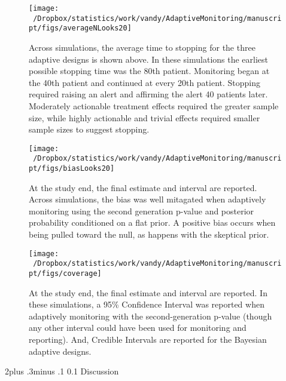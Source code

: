 \documentclass[12pt,oneside]{book}
\makeatletter
\newlength{\li}\setlength{\li}{14.48pt}
\newlength{\di}\setlength{\di}{-3.5mm}
\renewcommand\section{ \@startsection {section}{1}{\z@}%
    {2\@bls  plus .3\@bls minus .1\@bls}%
    {0.1\@bls}%
    {\centering\normalfont}}
\theoremstyle{definition}
\theoremstyle{definition}
\theoremstyle{definition}
\theoremstyle{remark}
\makeatother
\begin{document}
\begin{figure}[H]

{\centering \texttt{[image: ~/Dropbox/statistics/work/vandy/AdaptiveMonitoring/manuscript/figs/averageNLooks20]} 

}

\caption{Across  simulations, the average time to stopping for the three adaptive designs is shown above.  In these simulations the earliest possible stopping time was the 80th patient.  Monitoring began at the 40th patient and continued at every 20th patient.  Stopping required raising an alert and affirming the alert 40 patients later.  Moderately actionable treatment effects required the greater sample size, while highly actionable and trivial effects required smaller sample sizes to suggest stopping.}\label{fig:sampleSize}
\end{figure}

\begin{figure}[H]

{\centering \texttt{[image: ~/Dropbox/statistics/work/vandy/AdaptiveMonitoring/manuscript/figs/biasLooks20]} 

}

\caption{At the study end, the final estimate and interval are reported.  Across simulations, the bias was well mitagated when adaptively monitoring using the second generation p-value and posterior probability conditioned on a flat prior.  A positive bias occurs when being pulled toward the null, as happens with the skeptical prior.}\label{fig:bias}
\end{figure}

\begin{figure}[H]

{\centering \texttt{[image: ~/Dropbox/statistics/work/vandy/AdaptiveMonitoring/manuscript/figs/coverage]} 

}

\caption{At the study end, the final estimate and interval are reported.  In these simulations, a 95\% Confidence Interval was reported when adaptively monitoring with the second-generation p-value (though any other interval could have been used for monitoring and reporting).  And, Credible Intervals are reported for the Bayesian adaptive designs.}\label{fig:coverage}
\end{figure}

\hypertarget{discussion}{%
\section{Discussion}\label{discussion}}
\end{document}
